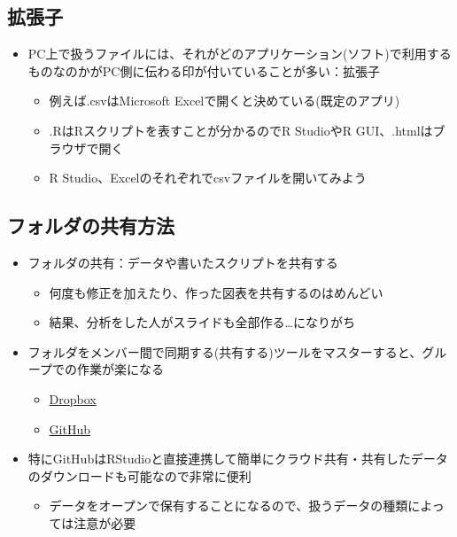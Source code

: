 \documentclass[
]{ltjsarticle}
\providecommand{\tightlist}{%
  \setlength{\itemsep}{0pt}\setlength{\parskip}{0pt}}
\begin{document}
\hypertarget{ux62e1ux5f35ux5b50}{%
\subsection{拡張子}\label{ux62e1ux5f35ux5b50}}

\begin{itemize}
\tightlist
\item
  PC上で扱うファイルには、それがどのアプリケーション(ソフト)で利用するものなのかがPC側に伝わる印が付いていることが多い：拡張子

  \begin{itemize}
  \tightlist
  \item
    例えば.csvはMicrosoft Excelで開くと決めている(既定のアプリ)
  \item
    .RはRスクリプトを表すことが分かるのでR StudioやR
    GUI、.htmlはブラウザで開く
  \item
    R Studio、Excelのそれぞれでcsvファイルを開いてみよう
  \end{itemize}
\end{itemize}

\hypertarget{ux30d5ux30a9ux30ebux30c0ux306eux5171ux6709ux65b9ux6cd5}{%
\subsection{フォルダの共有方法}\label{ux30d5ux30a9ux30ebux30c0ux306eux5171ux6709ux65b9ux6cd5}}

\begin{itemize}
\tightlist
\item
  フォルダの共有：データや書いたスクリプトを共有する

  \begin{itemize}
  \tightlist
  \item
    何度も修正を加えたり、作った図表を共有するのはめんどい
  \item
    結果、分析をした人がスライドも全部作る\ldots になりがち
  \end{itemize}
\item
  フォルダをメンバー間で同期する(共有する)ツールをマスターすると、グループでの作業が楽になる

  \begin{itemize}
  \tightlist
  \item
    \href{https://www.dropbox.com/}{Dropbox}
  \item
    \href{https://github.com/}{GitHub}
  \end{itemize}
\item
  特にGitHubはRStudioと直接連携して簡単にクラウド共有・共有したデータのダウンロードも可能なので非常に便利

  \begin{itemize}
  \tightlist
  \item
    データをオープンで保有することになるので、扱うデータの種類によっては注意が必要
  \end{itemize}
\end{itemize}
\end{document}
